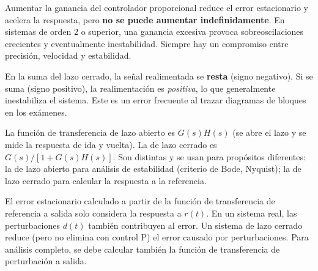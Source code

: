 \begin{errorcomon}
  Aumentar la ganancia del controlador proporcional reduce el error estacionario
  y acelera la respuesta, pero \textbf{no se puede aumentar indefinidamente}.
  En sistemas de orden 2 o superior, una ganancia excesiva provoca
  sobreoscilaciones crecientes y eventualmente inestabilidad. Siempre hay
  un compromiso entre precisión, velocidad y estabilidad.
\end{errorcomon}

\begin{errorcomon}
  En la suma del lazo cerrado, la señal realimentada se \textbf{resta}
  (signo negativo). Si se suma (signo positivo), la realimentación es
  \textit{positiva}, lo que generalmente inestabiliza el sistema. Este es
  un error frecuente al trazar diagramas de bloques en los exámenes.
\end{errorcomon}

\begin{errorcomon}
  La función de transferencia de lazo abierto es $G(s)H(s)$ (se abre el lazo
  y se mide la respuesta de ida y vuelta). La de lazo cerrado es
  $G(s)/[1+G(s)H(s)]$. Son distintas y se usan para propósitos diferentes:
  la de lazo abierto para análisis de estabilidad (criterio de Bode, Nyquist);
  la de lazo cerrado para calcular la respuesta a la referencia.
\end{errorcomon}

\begin{errorcomon}
  El error estacionario calculado a partir de la función de transferencia
  de referencia a salida solo considera la respuesta a $r(t)$. En un sistema
  real, las perturbaciones $d(t)$ también contribuyen al error.
  Un sistema de lazo cerrado reduce (pero no elimina con control P) el error
  causado por perturbaciones. Para análisis completo, se debe calcular
  también la función de transferencia de perturbación a salida.
\end{errorcomon}
